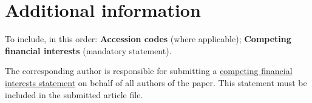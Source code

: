 \documentclass[fleqn,10pt]{wlscirep}
\begin{document}
\section*{Additional information}

To include, in this order: \textbf{Accession codes} (where applicable); \textbf{Competing financial interests} (mandatory statement).

The corresponding author is responsible for submitting a \href{http://www.nature.com/srep/policies/index.html#competing}{competing financial interests statement} on behalf of all authors of the paper. This statement must be included in the submitted article file.
\end{document}
